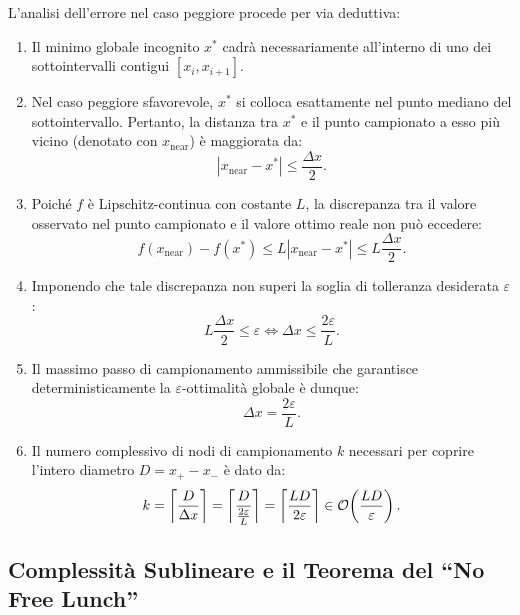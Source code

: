 L'analisi dell'errore nel caso peggiore procede per via deduttiva:
\begin{enumerate}
    \item Il minimo globale incognito $x^*$ cadr\`a necessariamente all'interno di uno dei sottointervalli contigui $[x_i, x_{i+1}]$.
    \item Nel caso peggiore sfavorevole, $x^*$ si colloca esattamente nel punto mediano del sottointervallo. Pertanto, la distanza tra $x^*$ e il punto campionato a esso pi\`u vicino (denotato con $x_{\text{near}}$) \`e maggiorata da:
    \begin{equation}
        |x_{\text{near}} - x^*| \le \frac{\Delta x}{2}.
    \end{equation}
    \item Poich\'e $f$ \`e Lipschitz-continua con costante $L$, la discrepanza tra il valore osservato nel punto campionato e il valore ottimo reale non pu\`o eccedere:
    \begin{equation}
        f(x_{\text{near}}) - f(x^*) \le L |x_{\text{near}} - x^*| \le L \frac{\Delta x}{2}.
    \end{equation}
    \item Imponendo che tale discrepanza non superi la soglia di tolleranza desiderata $\varepsilon$:
    \begin{equation}
        L \frac{\Delta x}{2} \le \varepsilon \iff \Delta x \le \frac{2\varepsilon}{L}.
    \end{equation}
    \item Il massimo passo di campionamento ammissibile che garantisce deterministicamente la $\varepsilon$-ottimalit\`a globale \`e dunque:
    \begin{equation}
        \Delta x = \frac{2\varepsilon}{L}.
    \end{equation}
    \item Il numero complessivo di nodi di campionamento $k$ necessari per coprire l'intero diametro $D = x_+ - x_-$ \`e dato da:
    \begin{equation}
        k = \left\lceil \frac{D}{\Delta x} \right\rceil = \left\lceil \frac{D}{\frac{2\varepsilon}{L}} \right\rceil = \left\lceil \frac{LD}{2\varepsilon} \right\rceil \in \mathcal{O}\!\left(\frac{LD}{\varepsilon}\right).
        \label{eq:complessita-lipschitz-globale}
    \end{equation}
\end{enumerate}

\subsection{Complessit\`a Sublineare e il Teorema del ``No Free Lunch''}

